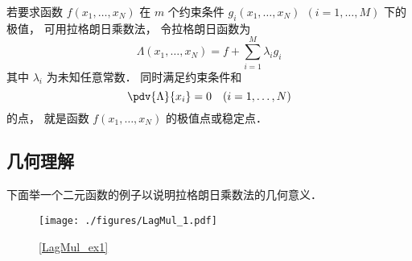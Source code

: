 

若要求函数 $f(x_1,\dots, x_N)$ 在 $m$ 个约束条件 $g_i(x_1, \dots, x_N)\ \ (i = 1,\dots, M)$ 下的极值， 可用拉格朗日乘数法， 令拉格朗日函数为
\begin{equation}
\Lambda(x_1,\dots, x_N) = f + \sum_{i=1}^M \lambda_i g_i
\end{equation} 
其中 $\lambda_i$ 为未知任意常数． 同时满足约束条件和
\begin{equation}
\pdv{\Lambda}{x_i} = 0 \quad (i = 1,\dots, N)
\end{equation}
的点， 就是函数 $f(x_1, \dots, x_N)$ 的极值点或稳定点．

\subsection{几何理解}

下面举一个二元函数的例子以说明拉格朗日乘数法的几何意义．

\begin{figure}[ht]
\centering
\texttt{[image: ./figures/LagMul\_1.pdf]}
\caption{\autoref{LagMul_ex1} } \label{LagMul_fig1}
\end{figure}

